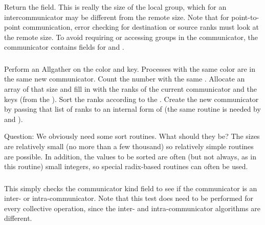 \documentclass{article}
\begin{document}
\subsubsection{}
Return the  field.  This is really the size of the local
group, which for an intercommunicator may be different from the remote
size.  Note that for point-to-point communication, error checking for
destination or source ranks must look at the remote size.  To avoid
requiring or accessing groups in the communicator, the communicator
contains fields for  and
. 

\subsubsection{}
Perform an Allgather on the color and key.  Processes with the same color are
in the same new communicator.  Count the number with the same
.  Allocate an array of that size and fill in with the
ranks of the current communicator and the keys (from the
).  Sort the ranks according to the .
Create the new communicator by passing that list of ranks to an
internal form of  (the same routine is needed
by  and ). 

Question: We obviously need some sort routines.  What should they be?
The sizes are relatively small (no more than a few thousand) so
relatively simple routines are possible.  In addition, the values to
be sorted are often (but not always, as in this routine) small
integers, so special radix-based routines can often be used.

\subsubsection{}


This simply checks the communicator kind field to see if the
communicator is an inter- or intra-communicator.
Note that this test does need to be performed for every collective operation,
since the inter- and intra-communicator algorithms are different.
\end{document}
